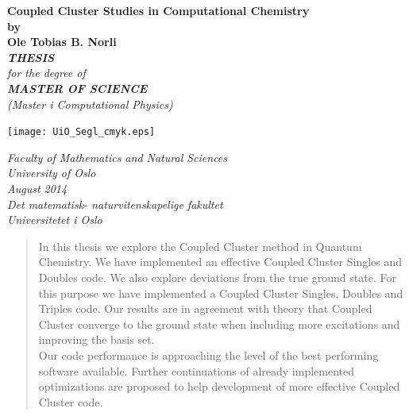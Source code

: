 \documentclass[a4paper,norsk,11pt,twoside]{report}
\date{}
\title{}
\author{}
\begin{document}
\thispagestyle{empty}
\begin{center}        %
  \vspace{5mm}          %
  \LARGE
  \textbf{Coupled Cluster Studies in Computational Chemistry} \\
  \Large
  \vspace{5mm}
  \textbf{by} \\
  \vspace{5mm}
  \large
  \textbf{Ole Tobias B. Norli} \\
  \vspace{30mm}
  \Large
  {\bf{\textsl{THESIS}}} \\
  \textsl{for the degree of} \\
  \vspace{2mm}
  {\bf{\textsl{MASTER OF SCIENCE}}} \\
  \vspace{5mm}
  {\large \textsl {(Master i Computational Physics)}}\\
  \vspace{10mm}
  \centerline{\texttt{[image: UiO\_Segl\_cmyk.eps]}}
  \vspace{5mm}
  \textsl{Faculty of Mathematics and Natural Sciences} \\
  \textsl{University of Oslo} \\
  \vspace{10mm}
  \large
  \textsl{August 2014} \\
  \vspace{5mm}
  \normalsize
  \textsl{Det matematisk- naturvitenskapelige fakultet} \\
  \textsl{Universitetet i Oslo} \\
\end{center}


\begin{abstract}
In this thesis we explore the Coupled Cluster method in Quantum Chemistry. We have implemented an effective Coupled Cluster Singles and Doubles code. We also explore deviations from the true ground state. For this purpose we have implemented a Coupled Cluster Singles, Doubles and Triples code. Our results are in agreement with theory that Coupled Cluster converge to the ground state when including more excitations and improving the basis set. \\

Our code performance is approaching the level of the best performing software available. Further continuations of already implemented optimizations are proposed to help development of more effective Coupled Cluster code.
\end{abstract}
\end{document}
